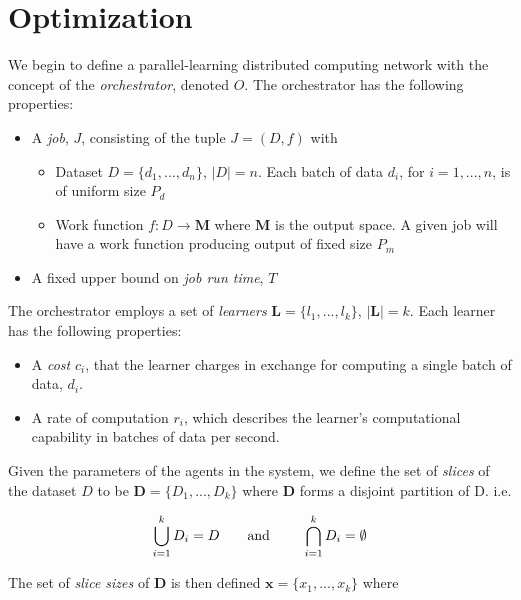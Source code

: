 \documentclass[../mthe-493-final-project.tex]{subfiles}
\begin{document}
    \section{Optimization}
    \label{sec:optimization-problem-description}

    We begin to define a parallel-learning distributed computing network with the concept of the \textit{orchestrator}, denoted $O$. The orchestrator has the following properties:

    \begin{itemize}
        
        \item A \textit{job}, $J$, consisting of the tuple $J = (D, f)$ with
             \begin{itemize}
                  \item Dataset $D = \{d_1, ..., d_n\}$, $\vert D\vert = n$. Each batch of data $d_i$, for $i = 1,...,n$, is of uniform size $P_d$
                  \item Work function $f: D \rightarrow \mathbf{M}$ where $\mathbf{M}$ is the output space. A given job will have a work function producing output of fixed size $P_m$
              \end{itemize}
        \item A fixed upper bound on \textit{job run time}, $T$
    \end{itemize}
    
    The orchestrator employs a set of \textit{learners} $\mathbf{L} = \{l_1, ..., l_k\}$, $\vert\mathbf{L}\vert = k$. Each learner has the following properties:
    
    \begin{itemize}
        \item A \textit{cost} $c_i$, that the learner charges in exchange for computing a single batch of data, $d_i$.
        \item A rate of computation $r_i$, which describes the learner's computational capability in batches of data per second.
    \end{itemize}
    
    Given the parameters of the agents in the system, we define the set of \textit{slices} of the dataset $D$ to be $\boldsymbol{D} = \{D_1,...,D_k\}$ where $\boldsymbol{D}$ forms a disjoint partition of D. i.e.
    
    \[\bigcup\limits_{i=1}^k D_i = D \textrm{\qquad and \qquad} \bigcap\limits_{i=1}^k D_i = \emptyset\]

    The set of \textit{slice sizes} of $\boldsymbol{D}$ is then defined $\mathbf{x} = \{x_1,...,x_k\}$ where
    
\end{document}
